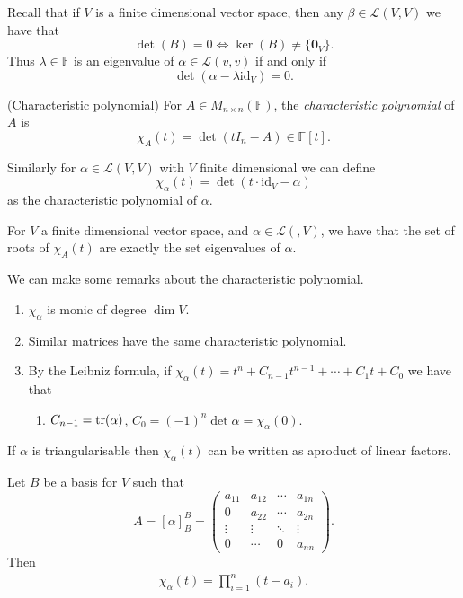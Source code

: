 \documentclass{article}
\newcommand{\F}{\mathbb{F}}
\renewcommand{\id}{\mathrm{id}}
\begin{document}
Recall that if $ V $ is a finite dimensional vector space, then any $ \beta\in\mathcal L(V,V) $ we have that
\[
	\det(B)=0\iff \ker(B)\ne \{\mathbf 0_V\}.
\]
Thus $ \lambda\in \F $ is an eigenvalue of $ \alpha\in\mathcal L(v,v) $ if and only if
\[
  \det(\alpha-\lambda\id_V)=0.
\]
\begin{definition}
	(Characteristic polynomial) For $ A\in M_{n\times n}(\F) $, the \textit{characteristic polynomial} of $ A $ is
	\[
		\chi_A(t)=\det(tI_n-A)\in \F[t].
	\]
\end{definition}
Similarly for $ \alpha\in\mathcal L(V,V) $ with $ V $ finite dimensional we can define
\[
  \chi_\alpha(t)=\det(t\cdot\id_V-\alpha)
\]
as the characteristic polynomial of $ \alpha $.
\begin{lemma}
  For $ V $ a finite dimensional vector space, and $ \alpha\in\mathcal L(,V) $, we have that the set of roots of $ \chi_A(t) $ are exactly the set eigenvalues of $ \alpha $.
\end{lemma}
\begin{remark}
  We can make some remarks about the characteristic polynomial.
  \begin{enumerate}
	  \item $ \chi_\alpha $ is monic of degree $ \dim V $.
	  \item Similar matrices have the same characteristic polynomial.
	  \item  By the Leibniz formula, if $ \chi_\alpha(t)=t^n+C_{n-1}t^{n-1}+\cdots + C_1t+C_0 $ we have that
		  \begin{enumerate}
			  \item $ C_{n-1}=\tr(\alpha) $,
				  $ C_0=(-1)^n\det \alpha=\chi_\alpha(0) $.
		  \end{enumerate}
  \end{enumerate}
\end{remark}
\begin{proposition}
  If $ \alpha $ is triangularisable then $ \chi_\alpha(t) $ can be written as aproduct of linear factors.
\end{proposition}
\pf Let $ B $ be a basis for $ V $ such that
\[
	A=[\alpha]^B_B=\begin{pmatrix}
		a_{11} & a_{12} & \cdots & a_{1n} \\
		0 & a_{22} & \cdots & a_{2n} \\
		\vdots & \vdots & \ddots & \vdots \\
		0 & \cdots & 0 & a_{nn}
	\end{pmatrix}.
\]
Then
\begin{align*}
	\chi_\alpha(t) = \prod_{i=1}^n(t-a_i).
\end{align*}
\end{document}
